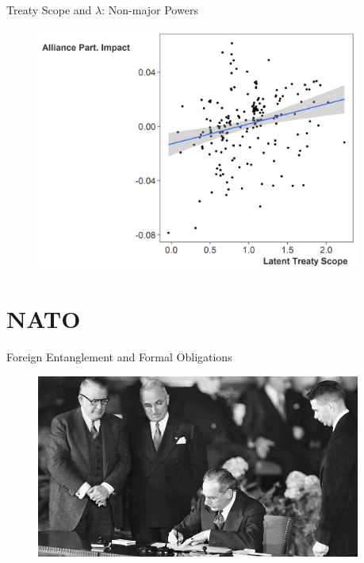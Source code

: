 \documentclass{beamer}
\begin{document}
\begin{frame}{Treaty Scope and $\lambda$: Non-major Powers}

\begin{figure}
	\centering
		\includegraphics[width=0.95\textwidth]{ls-lambda-min.png}
	\label{fig:ls-lambda-min}
\end{figure}


\end{frame}


\section{NATO}


\begin{frame}{Foreign Entanglement and Formal Obligations}

\begin{figure}
	\centering
		\includegraphics[width=0.95\textwidth]{acheson-nato-sign.jpg}
	\label{fig:acheson-nato-sign}
\end{figure}


\end{frame}
\end{document}
